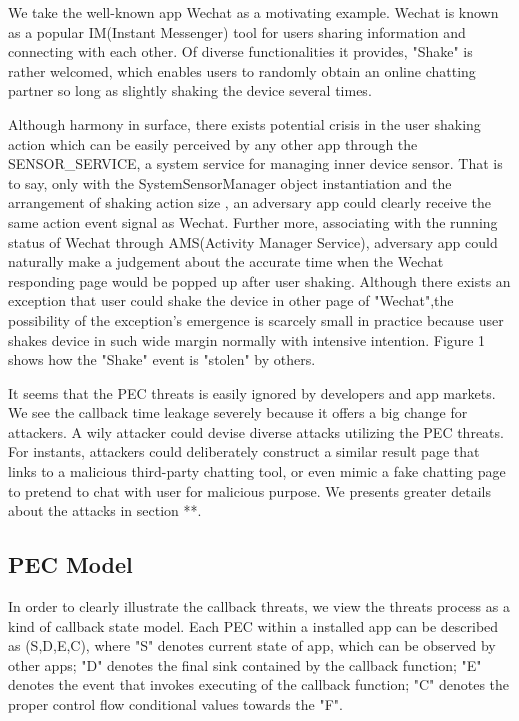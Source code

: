 \documentclass{sig-alternate-05-2015}
\begin{document}
We take the well-known app Wechat as a motivating example. Wechat is known as a popular IM(Instant Messenger) tool for users sharing information and connecting with each other. Of diverse functionalities it provides, "Shake" is rather welcomed, which enables users to randomly obtain an online chatting partner so long as slightly shaking the device several times.

Although harmony in surface, there exists potential crisis in the user shaking action which can be easily perceived by any other app through the {\color{red}SENSOR\_SERVICE}, a system service for managing inner device sensor. That is to say, only with the {\color{red}SystemSensorManager} object instantiation and the arrangement of shaking action size , an adversary app could clearly receive the same action event signal as Wechat. Further more, associating with the running status of Wechat through {\color{red}AMS(Activity Manager Service)}, adversary app could naturally make a judgement about the accurate time when the Wechat responding page would be popped up after user shaking. Although there exists an exception that user could shake the device in other page of "Wechat",the possibility of the exception's emergence is scarcely small in practice because user shakes device in such wide margin normally with intensive intention. {\color{red}Figure 1} shows how the "Shake" event is "stolen" by others. 

It seems that the PEC threats is easily ignored by developers and app markets. We see the callback time leakage severely because it offers a big change for attackers. A wily attacker could devise diverse attacks utilizing the PEC threats. For instants, attackers could deliberately construct a similar result page that links to a malicious third-party chatting tool, or even mimic a fake chatting page to pretend to chat with user for malicious purpose. We presents greater details about the attacks in section **.

\subsection{PEC Model} 

In order to clearly illustrate the callback threats, we view the threats process as a kind of callback state model. Each PEC within a installed app can be described as (S,D,E,C), where "S" denotes current state of app, which can be observed by other apps; "D" denotes the final sink contained by the callback function; "E" denotes the event that invokes executing of the callback function; "C" denotes the proper control flow conditional values towards the "F".
\end{document}

